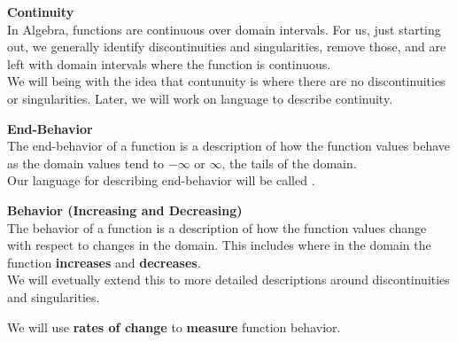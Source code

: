 \documentclass{ximera}
\begin{document}
\begin{explanation}  \textbf{\textcolor{blue!75!black}{Continuity}} \\

In Algebra, functions are continuous over domain intervals.  For us, just starting out, we generally identify discontinuities and singularities, remove those, and are left with domain intervals where the function is continuous. \\


We will being with the idea that contunuity is where there are no discontinuities or singularities.  Later, we will work on language to describe continuity.

\end{explanation}







\begin{explanation}  \textbf{\textcolor{blue!75!black}{End-Behavior}} \\

The end-behavior of a function is a description of how the function values behave as the domain values tend to $-\infty$ or $\infty$, the tails of the domain. \\


Our language for describing end-behavior will be called .

\end{explanation}









\begin{explanation}  \textbf{\textcolor{blue!75!black}{Behavior (Increasing and Decreasing)}} \\

The behavior of a function is a description of how the function values change with respect to changes in the domain.  This includes where in the domain the function \textbf{\textcolor{purple!85!blue}{increases}} and \textbf{\textcolor{purple!85!blue}{decreases}}. \\


We will evetually extend this to more detailed descriptions around discontinuities and singularities.


We will use \textbf{rates of change} to \textbf{measure} function behavior.

\end{explanation}
\end{document}
